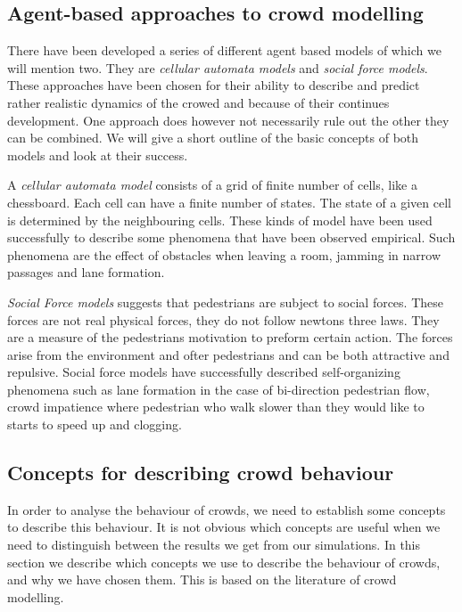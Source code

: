 \subsection{Agent-based approaches to crowd modelling}\label{subsec:ABapproach}
There have been developed a series of different agent based models of which we will mention two. They are \emph{cellular automata models} and \emph{social force models}. These approaches have been chosen for their ability to describe and predict rather realistic dynamics of the crowed and because of their continues development.
One approach does however not necessarily rule out the other they can be combined. 
We will give a short outline of the basic concepts of both models and look at their success.

A \emph{cellular automata model} consists of a grid of finite number of cells, like a chessboard. Each cell can have a finite number of states. The state of a given cell is determined by the neighbouring cells. These kinds of model have been used successfully to describe some phenomena that have been observed empirical. Such phenomena are the effect of obstacles when leaving a room, jamming in narrow passages and lane formation. 

\emph{Social Force models} suggests that pedestrians are subject to social forces. These forces are not real physical forces, they do not follow newtons three laws. They are a measure of the pedestrians motivation to preform certain action. The forces arise from the environment and ofter pedestrians and can be both attractive and repulsive. 
Social force models have successfully described self-organizing phenomena such 
as lane formation in the case of bi-direction pedestrian flow, crowd impatience where pedestrian who walk slower than they would like to starts to speed up and clogging. 


\subsection{Concepts for describing crowd behaviour}\label{concepts}
In order to analyse the behaviour of crowds, we need to establish some 
concepts to describe this behaviour. It is not obvious which concepts  are 
useful when we need to distinguish between the results we get from our 
simulations. In this section we describe which concepts we use to describe the 
behaviour of crowds, and why we have chosen them. This is based on the 
literature of crowd modelling.

